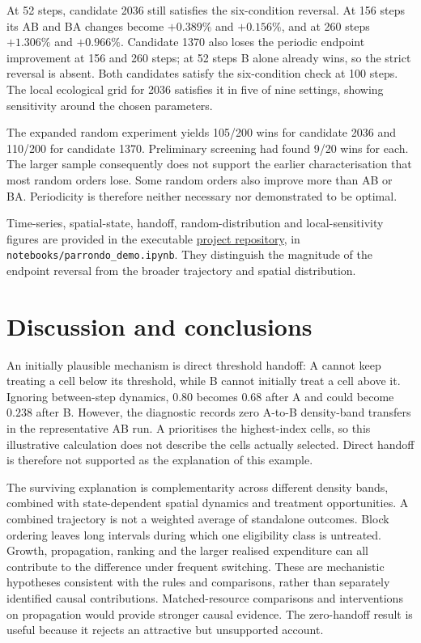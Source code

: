 \documentclass[a4paper,11pt]{article}
\begin{document}
At 52 steps, candidate 2036 still satisfies the six-condition reversal. At 156 steps its AB and BA changes become $+0.389\%$ and $+0.156\%$, and at 260 steps $+1.306\%$ and $+0.966\%$. Candidate 1370 also loses the periodic endpoint improvement at 156 and 260 steps; at 52 steps B alone already wins, so the strict reversal is absent. Both candidates satisfy the six-condition check at 100 steps. The local ecological grid for 2036 satisfies it in five of nine settings, showing sensitivity around the chosen parameters.

The expanded random experiment yields 105/200 wins for candidate 2036 and 110/200 for candidate 1370. Preliminary screening had found 9/20 wins for each. The larger sample consequently does not support the earlier characterisation that most random orders lose. Some random orders also improve more than AB or BA. Periodicity is therefore neither necessary nor demonstrated to be optimal.

Time-series, spatial-state, handoff, random-distribution and local-sensitivity figures are provided in the executable \href{https://github.com/RayYouDS/cits4403-parrondo-weed-control}{project repository}, in \texttt{notebooks/parrondo\_demo.ipynb}. They distinguish the magnitude of the endpoint reversal from the broader trajectory and spatial distribution.

\newpage
\section{Discussion and conclusions}
An initially plausible mechanism is direct threshold handoff: A cannot keep treating a cell below its threshold, while B cannot initially treat a cell above it. Ignoring between-step dynamics, $0.80$ becomes $0.68$ after A and could become $0.238$ after B. However, the diagnostic records zero A-to-B density-band transfers in the representative AB run. A prioritises the highest-index cells, so this illustrative calculation does not describe the cells actually selected. Direct handoff is therefore not supported as the explanation of this example.

The surviving explanation is complementarity across different density bands, combined with state-dependent spatial dynamics and treatment opportunities. A combined trajectory is not a weighted average of standalone outcomes. Block ordering leaves long intervals during which one eligibility class is untreated. Growth, propagation, ranking and the larger realised expenditure can all contribute to the difference under frequent switching. These are mechanistic hypotheses consistent with the rules and comparisons, rather than separately identified causal contributions. Matched-resource comparisons and interventions on propagation would provide stronger causal evidence. The zero-handoff result is useful because it rejects an attractive but unsupported account.
\end{document}
